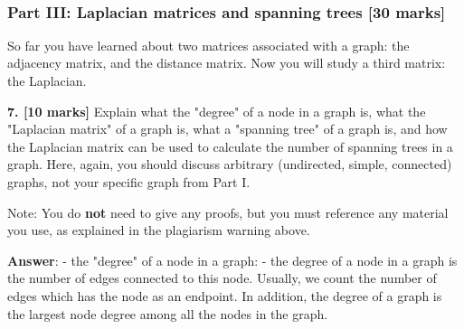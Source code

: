 \documentclass[11pt]{article}
\begin{document}
    \begin{center}
    \end{center}
    { \hspace*{\fill} \\}
    
    \subsubsection{Part III: Laplacian matrices and spanning trees {[}30
marks{]}}\label{part-iii-laplacian-matrices-and-spanning-trees-30-marks}

So far you have learned about two matrices associated with a graph: the
adjacency matrix, and the distance matrix. Now you will study a third
matrix: the Laplacian.

\textbf{7. {[}10 marks{]}} Explain what the "degree" of a node in a
graph is, what the "Laplacian matrix" of a graph is, what a "spanning
tree" of a graph is, and how the Laplacian matrix can be used to
calculate the number of spanning trees in a graph. Here, again, you
should discuss arbitrary (undirected, simple, connected) graphs, not
your specific graph from Part I.

Note: You do \textbf{not} need to give any proofs, but you must
reference any material you use, as explained in the plagiarism warning
above.

    \textbf{Answer}: - the "degree" of a node in a graph: - the degree of a
node in a graph is the number of edges connected to this node. Usually,
we count the number of edges which has the node as an endpoint. In
addition, the degree of a graph is the largest node degree among all the
nodes in the graph.
\end{document}
